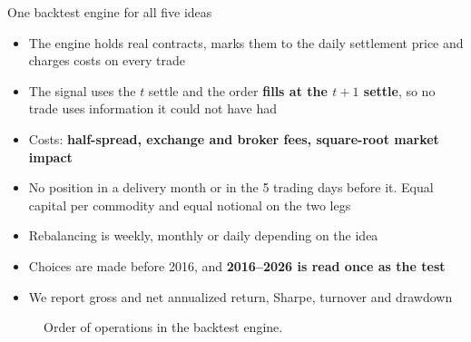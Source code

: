 \documentclass[10pt, aspectratio=169]{beamer}
\newcommand{\key}[1]{\textcolor{accent}{\textbf{#1}}}
\begin{document}
\begin{frame}{One backtest engine for all five ideas}
\footnotesize
\begin{itemize}
  \item The engine holds real contracts, marks them to the daily settlement price
        and charges costs on every trade
  \item The signal uses the $t$ settle and the order \key{fills at the $t+1$
        settle}, so no trade uses information it could not have had
  \item Costs: \key{half-spread, exchange and broker fees, square-root market impact}
  \item No position in a delivery month or in the 5 trading days before it.
        Equal capital per commodity and equal notional on the two legs
  \item Rebalancing is weekly, monthly or daily depending on the idea
  \item Choices are made before 2016, and \key{2016--2026 is read once as the test}
  \item We report gross and net annualized return, Sharpe, turnover and drawdown
\end{itemize}
\begin{figure}
\centering
{}
\caption{Order of operations in the backtest engine.}
\end{figure}
\end{frame}
\end{document}
